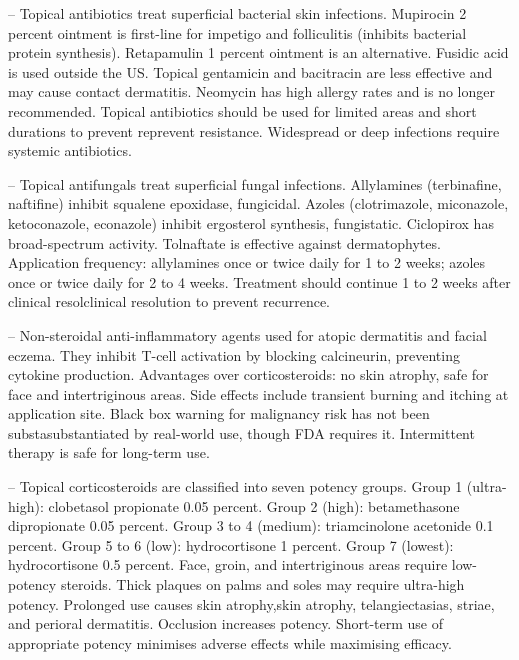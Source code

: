 -- Topical antibiotics treat superficial bacterial skin infections. Mupirocin 2 percent ointment is first-line for impetigo and folliculitis (inhibits bacterial protein synthesis). Retapamulin 1 percent ointment is an alternative. Fusidic acid is used outside the US. Topical gentamicin and bacitracin are less effective and may cause contact dermatitis. Neomycin has high allergy rates and is no longer recommended. Topical antibiotics should be used for limited areas and short durations to prevent reprevent resistance. Widespread or deep infections require systemic antibiotics.

-- Topical antifungals treat superficial fungal infections. Allylamines (terbinafine, naftifine) inhibit squalene epoxidase, fungicidal. Azoles (clotrimazole, miconazole, ketoconazole, econazole) inhibit ergosterol synthesis, fungistatic. Ciclopirox has broad-spectrum activity. Tolnaftate is effective against dermatophytes. Application frequency: allylamines once or twice daily for 1 to 2 weeks; azoles once or twice daily for 2 to 4 weeks. Treatment should continue 1 to 2 weeks after clinical resolclinical resolution to prevent recurrence.

-- Non-steroidal anti-inflammatory agents used for atopic dermatitis and facial eczema. They inhibit T-cell activation by blocking calcineurin, preventing cytokine production. Advantages over corticosteroids: no skin atrophy, safe for face and intertriginous areas. Side effects include transient burning and itching at application site. Black box warning for malignancy risk has not been substasubstantiated by real-world use, though FDA requires it. Intermittent therapy is safe for long-term use.

-- Topical corticosteroids are classified into seven potency groups. Group 1 (ultra-high): clobetasol propionate 0.05 percent. Group 2 (high): betamethasone dipropionate 0.05 percent. Group 3 to 4 (medium): triamcinolone acetonide 0.1 percent. Group 5 to 6 (low): hydrocortisone 1 percent. Group 7 (lowest): hydrocortisone 0.5 percent. Face, groin, and intertriginous areas require low-potency steroids. Thick plaques on palms and soles may require ultra-high potency. Prolonged use causes skin atrophy,skin atrophy, telangiectasias, striae, and perioral dermatitis. Occlusion increases potency. Short-term use of appropriate potency minimises adverse effects while maximising efficacy.

